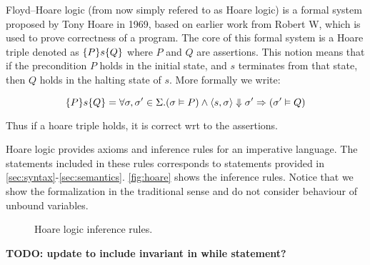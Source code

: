 Floyd–Hoare logic (from now simply refered to as Hoare logic) is a formal system proposed by Tony Hoare in 1969,
based on earlier work from Robert W, which is used to prove correctness of a program.
The core of this formal system is a Hoare triple denoted as $\{P\}s\{Q\}$
where $P$ and $Q$ are assertions.
This notion means that if the precondition $P$ holds in the initial state,
and $s$ terminates from that state, then $Q$ holds in the halting state of $s$. More formally we write:

$$\{P\}s\{Q\} = \forall \sigma, \sigma' \in \Sigma. (\sigma \vDash P) \wedge \langle s, \sigma \rangle \Downarrow \sigma' \Rightarrow (\sigma' \vDash Q)$$

Thus if a hoare triple holds, it is correct wrt to the assertions.

Hoare logic provides axioms and inference rules for an imperative language.
The statements included in these rules corresponds to statements provided in \ref{sec:syntax}-\ref{sec:semantics}. \autoref{fig:hoare} shows the inference rules.
Notice that we show the formalization in the traditional sense and do not consider behaviour of unbound variables.

\begin{figure}[h!]

\inference[HSkip]{}
{}

\inference[HAssign]{}
{}

{}

{}

{}

{}

\caption{Hoare logic inference rules.}
\label{fig:hoare}
\end{figure}

\textbf{TODO: update to include invariant in while statement?}

